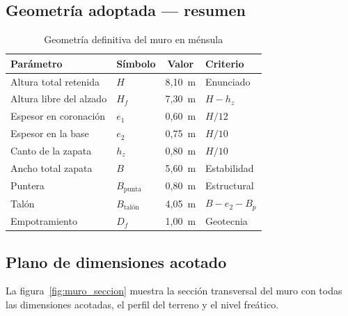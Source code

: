 \subsection{Geometría adoptada — resumen}
\label{subsec:geom_adoptada}

\begin{table}[H]
  \centering
  \caption{Geometría definitiva del muro en ménsula}
  \label{tab:geom_muro}
  \begin{tabular}{@{}llcl@{}}
    \toprule
    \textbf{Parámetro} & \textbf{Símbolo} & \textbf{Valor} & \textbf{Criterio} \\
    \midrule
    Altura total retenida  & $H$               & 8{,}10~m & Enunciado \\
    Altura libre del alzado & $H_f$            & 7{,}30~m & $H - h_z$ \\
    Espesor en coronación  & $e_1$             & 0{,}60~m & $H/12$ \\
    Espesor en la base     & $e_2$             & 0{,}75~m & $H/10$ \\
    Canto de la zapata     & $h_z$             & 0{,}80~m & $H/10$ \\
    Ancho total zapata     & $B$               & 5{,}60~m & Estabilidad \\
    Puntera                & $B_{\text{punta}}$ & 0{,}80~m & Estructural \\
    Talón                  & $B_{\text{talón}}$ & 4{,}05~m & $B-e_2-B_p$ \\
    Empotramiento          & $D_f$             & 1{,}00~m & Geotecnia \\
    \bottomrule
  \end{tabular}
\end{table}

\subsection{Plano de dimensiones acotado}
\label{subsec:plano_dim}

La figura~\ref{fig:muro_seccion} muestra la sección transversal del muro con
todas las dimensiones acotadas, el perfil del terreno y el nivel freático.

